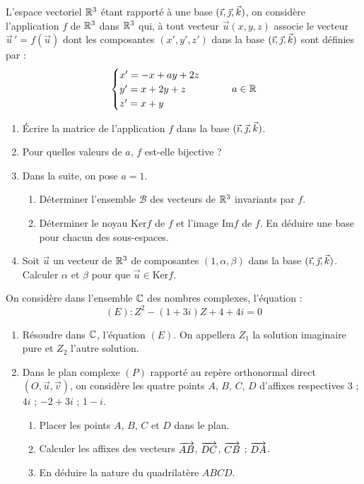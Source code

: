 \documentclass[11pt]{article}
\begin{document}


L'espace vectoriel $\mathbb{R}^3$ étant rapporté à une base $(\vec{\imath},\vec{\jmath},\vec{k})$, on considère l'application $f$ de $\mathbb{R}^3$ dans $\mathbb{R}^3$ qui, à tout vecteur $\vec{u}(x, y, z)$ associe le vecteur $\vec{u}\,' = f(\vec{u})$ dont les composantes $(x', y', z')$ dans la base $(\vec{\imath},\vec{\jmath},\vec{k})$ sont définies par :
\[ \begin{cases} x' = -x + ay + 2z \\ y' = x + 2y + z \\ z' = x + y \end{cases} \qquad a \in \mathbb{R} \]

\begin{enumerate}
  \item Écrire la matrice de l'application $f$ dans la base $(\vec{\imath},\vec{\jmath},\vec{k})$.
  \item Pour quelles valeurs de $a$, $f$ est-elle bijective ?
  \item Dans la suite, on pose $a = 1$.
  \begin{enumerate}[label=\alph*.]
    \item Déterminer l'ensemble $\mathcal{B}$ des vecteurs de $\mathbb{R}^3$ invariants par $f$.
    \item Déterminer le noyau $\mathrm{Ker}f$ de $f$ et l'image $\mathrm{Im}f$ de $f$. En déduire une base pour chacun des sous-espaces.
  \end{enumerate}
  \item Soit $\vec{u}$ un vecteur de $\mathbb{R}^3$ de composantes $(1, \alpha, \beta)$ dans la base $(\vec{\imath},\vec{\jmath},\vec{k})$. Calculer $\alpha$ et $\beta$ pour que $\vec{u} \in \mathrm{Ker}f$.
\end{enumerate}


On considère dans l'ensemble $\mathbb{C}$ des nombres complexes, l'équation :
\[ (E) : Z^2 - (1 + 3i)Z + 4 + 4i = 0 \]

\begin{enumerate}
  \item Résoudre dans $\mathbb{C}$, l'équation $(E)$. On appellera $Z_1$ la solution imaginaire pure et $Z_2$ l'autre solution.
  \item Dans le plan complexe $(P)$ rapporté au repère orthonormal direct $(O,\vec{u},\vec{v})$, on considère les quatre points $A$, $B$, $C$, $D$ d'affixes respectives $3$ ; $4i$ ; $-2 + 3i$ ; $1 - i$.
  \begin{enumerate}[label=\alph*]
    \item Placer les points $A$, $B$, $C$ et $D$ dans le plan.
    \item Calculer les affixes des vecteurs $\overrightarrow{AB}$, $\overrightarrow{DC}$, $\overrightarrow{CB}$ ; $\overrightarrow{DA}$.
    \item En déduire la nature du quadrilatère $ABCD$.
  \end{enumerate}
\end{enumerate}
\end{document}
